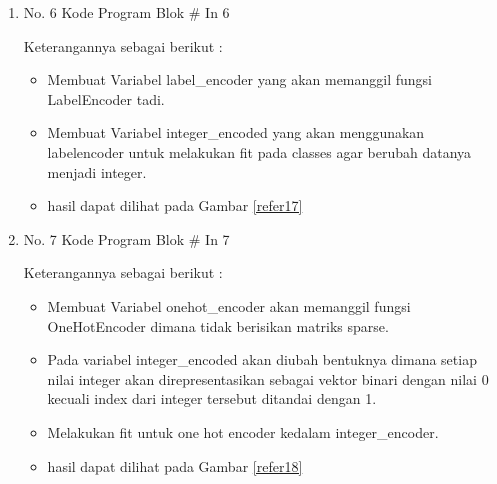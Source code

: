 \begin{enumerate}
\item No. 6 Kode Program Blok \# In 6
\par 
Keterangannya sebagai berikut :
\begin{itemize}
\item Membuat Variabel label\_encoder yang akan memanggil fungsi LabelEncoder tadi.
\item Membuat Variabel integer\_encoded yang akan menggunakan labelencoder untuk melakukan fit pada classes agar berubah datanya menjadi integer.
\item hasil dapat dilihat pada Gambar \ref{refer17}
\end{itemize}



\item No. 7 Kode Program Blok \# In 7
\par 
Keterangannya sebagai berikut :
\begin{itemize}
\item Membuat Variabel onehot\_encoder akan memanggil fungsi OneHotEncoder dimana tidak berisikan matriks sparse.
\item Pada variabel integer\_encoded akan diubah bentuknya dimana setiap nilai integer akan direpresentasikan sebagai vektor binari dengan nilai 0 kecuali index dari integer tersebut ditandai dengan 1.
\item Melakukan fit untuk one hot encoder kedalam integer\_encoder.
\item hasil dapat dilihat pada Gambar \ref{refer18}
\end{itemize}




\end{enumerate}
